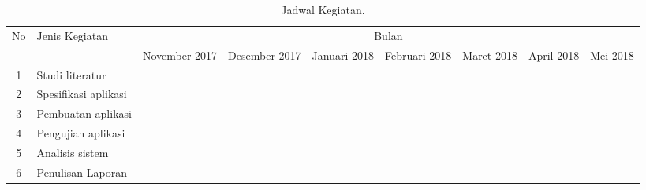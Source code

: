 \begin{table}[H]
	\caption{Jadwal Kegiatan.}
	
	\begin{center}
		\resizebox{\textwidth}{!}
		{\begin{tabular}{|c|p{5cm}|p{2cm}|p{2cm}|p{2cm}|p{2cm}|p{2cm}|p{2cm}|p{2cm}|}
				\hline 
				\multirow{2}{*}{No} & \multirow{2}{*}{Jenis Kegiatan} & \multicolumn{7}{c|}{Bulan}
				\tabularnewline
				
				\cline{3-9} 
				&  & November 2017 & Desember 2017 & Januari 2018 & Februari 2018 & Maret 2018 & April 2018 & Mei 2018
				\tabularnewline
				
				\hline 
				1 & Studi literatur & \cellcolor{cyan} & \cellcolor{cyan} &  &  &  &  & \tabularnewline
				
				\hline 
				2 & Spesifikasi aplikasi &  & \cellcolor{red} &  &  &  &  & \tabularnewline
				
				\hline 
				3 & Pembuatan aplikasi &&  
				\cellcolor{green} & \cellcolor{green} & \cellcolor{green} & \cellcolor{green} &  & \tabularnewline
				
				\hline 
				4 & Pengujian aplikasi &  &  &  &  & \cellcolor{darkgray} & \cellcolor{darkgray} & \tabularnewline
				
				\hline 
				5 & Analisis sistem &  &  &  &  &  & \cellcolor{lightgray} & \cellcolor{lightgray} \tabularnewline
				
				\hline 
				6 & Penulisan Laporan & \cellcolor{yellow} & \cellcolor{yellow} & \cellcolor{yellow} & \cellcolor{yellow} & \cellcolor{yellow} & \cellcolor{yellow} & \cellcolor{yellow} 
				\tabularnewline
				
				\hline 
		\end{tabular}}
		\par\end{center}
\end{table}